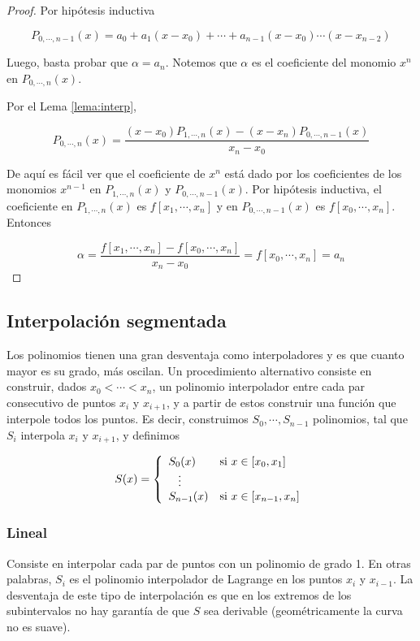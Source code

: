 \begin{propo}
\begin{proof}
Por hipótesis inductiva

\[P_{0, \cdots, n - 1}(x) = a_0 + a_1 (x - x_0) + \cdots + a_{n - 1} (x - x_0) \cdots (x - x_{n - 2})\]

Luego, basta probar que $\alpha = a_n$. Notemos que $\alpha$ es el coeficiente del monomio $x^n$ en $P_{0, \cdots, n}(x)$.

Por el Lema \ref{lema:interp},

\[P_{0, \cdots, n}(x) = \frac{(x - x_0)P_{1, \cdots, n}(x) - (x - x_n)P_{0, \cdots, n - 1}(x)}{x_n - x_0}\]

De aquí es fácil ver que el coeficiente de $x^n$ está dado por los coeficientes de los monomios $x^{n - 1}$ en $P_{1, \cdots, n}(x)$ y $P_{0, \cdots, n - 1}(x)$. Por hipótesis inductiva, el coeficiente en $P_{1, \cdots, n}(x)$ es $f[x_1, \cdots, x_n]$ y en $P_{0, \cdots, n - 1}(x)$ es $f[x_0, \cdots, x_n]$. Entonces 

\[\alpha = \frac{f[x_1, \cdots, x_n] - f[x_0, \cdots, x_n]}{x_n - x_0} = f[x_0, \cdots, x_n] = a_n\]
\end{proof}
\end{propo}

\subsection{Interpolación segmentada}

Los polinomios tienen una gran desventaja como interpoladores y es que cuanto mayor es su grado, más oscilan. Un procedimiento alternativo consiste en construir, dados $x_0 < \cdots < x_n$, un polinomio interpolador entre cada par consecutivo de puntos $x_i$ y $x_{i + 1}$, y a partir de estos construir una función que interpole todos los puntos. Es decir, construimos $S_0, \cdots, S_{n - 1}$ polinomios, tal que $S_i$ interpola $x_i$ y $x_{i + 1}$, y definimos

\[
S(x) = 
\left\{
	\begin{array}{ll}
		S_0(x)  & \mbox{si } x \in [x_{0}, x_1] \\
		\hspace{0.3cm}\vdots \\		
		S_{n - 1}(x) & \mbox{si } x \in [x_{n - 1}, x_n]
	\end{array}
\right.
\]

\subsubsection{Lineal}
Consiste en interpolar cada par de puntos con un polinomio de grado 1. En otras palabras, $S_i$ es el polinomio interpolador de Lagrange en los puntos $x_i$ y $x_{i - 1}$. La desventaja de este tipo de interpolación es que en los extremos de los subintervalos no hay garantía de que $S$ sea derivable (geométricamente la curva no es suave).

